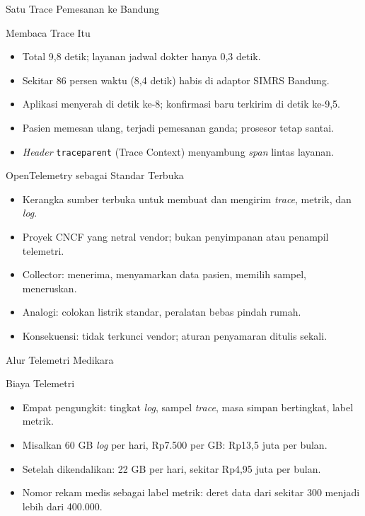\documentclass[aspectratio=169, table, 12pt]{beamer}
\begin{document}
\begin{frame}{{\Large Satu Trace Pemesanan ke Bandung}}
  \centering
\end{frame}

\begin{frame}{{\Large Membaca Trace Itu}}
  \vspace{10pt}
  \begin{itemize}
    \item Total 9,8 detik; layanan jadwal dokter hanya 0,3 detik.
    \item Sekitar 86 persen waktu (8,4 detik) habis di adaptor SIMRS Bandung.
    \item Aplikasi menyerah di detik ke-8; konfirmasi baru terkirim di detik ke-9,5.
    \item Pasien memesan ulang, terjadi pemesanan ganda; prosesor tetap santai.
    \item \textit{Header} \texttt{traceparent} (Trace Context) menyambung \textit{span}
          lintas layanan.
  \end{itemize}
\end{frame}

\begin{frame}{{\Large OpenTelemetry sebagai Standar Terbuka}}
  \vspace{10pt}
  \begin{itemize}
    \item Kerangka sumber terbuka untuk membuat dan mengirim \textit{trace}, metrik, dan
          \textit{log}.
    \item Proyek CNCF yang netral vendor; bukan penyimpanan atau penampil telemetri.
    \item Collector: menerima, menyamarkan data pasien, memilih sampel, meneruskan.
    \item Analogi: colokan listrik standar, peralatan bebas pindah rumah.
    \item Konsekuensi: tidak terkunci vendor; aturan penyamaran ditulis sekali.
  \end{itemize}
\end{frame}

\begin{frame}{{\Large Alur Telemetri Medikara}}
  \centering
\end{frame}

\begin{frame}{{\Large Biaya Telemetri}}
  \vspace{10pt}
  \begin{itemize}
    \item Empat pengungkit: tingkat \textit{log}, sampel \textit{trace}, masa simpan
          bertingkat, label metrik.
    \item Misalkan 60 GB \textit{log} per hari, Rp7.500 per GB: Rp13,5 juta per bulan.
    \item Setelah dikendalikan: 22 GB per hari, sekitar Rp4,95 juta per bulan.
    \item Nomor rekam medis sebagai label metrik: deret data dari sekitar 300 menjadi
          lebih dari 400.000.
  \end{itemize}
\end{frame}
\end{document}
